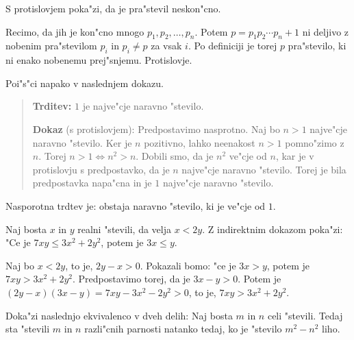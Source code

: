 \documentclass[11pt,paper=b5,footinclude,headinclude]{scrbook} %
\newtheorem{ex}{Vaja\hypertarget{sol:\theex}}[chapter]
\begin{document}
\begin{ex}
\end{ex} \begin{ex} S protislovjem poka"zi, da je pra"stevil neskon"cno.

\begin{sol}Recimo, da jih je kon"cno mnogo $p_1,p_2,\ldots, p_n$. Potem  $p=p_1p_2\cdots p_n+1$ ni deljivo z nobenim pra"stevilom $p_i$ in $p_i\neq p$ za vsak $i$. Po definiciji je torej $p$ pra"stevilo, ki ni enako nobenemu prej"snjemu. Protislovje.
\end{sol}

\end{ex} \begin{ex} Poi"s"ci napako v naslednjem dokazu. 

\begin{quote}
\textbf{Trditev:} $1$ je najve"cje naravno "stevilo. 

\textbf{Dokaz} (s protislovjem):
Predpostavimo nasprotno. Naj bo $n>1$ najve"cje naravno "stevilo. Ker je $n$ pozitivno, lahko neenakost $n>1$ pomno"zimo z $n$. Torej $n>1\Leftrightarrow n^2>n$. Dobili smo, da je $n^2$ ve"cje od $n$, kar je v protislovju s predpostavko, da je $n$ najve"cje naravno "stevilo. Torej je bila predpostavka napa"cna in je $1$ najve"cje naravno "stevilo.
\end{quote}


\begin{sol}
 Nasporotna trdtev je: obstaja naravno "stevilo, ki je ve"cje od $1$.
\end{sol}


\end{ex} \begin{ex} Naj bosta $x$ in $y$ realni "stevili, da velja $x<2y$. Z indirektnim dokazom poka"zi: "Ce je $7xy\leq 3x^2 + 2y^2$, potem je $3x\leq y$.

\begin{sol}Naj bo $x<2y$, to je, $2y-x>0$. Pokazali bomo: "ce je $3x> y$, potem je $7xy > 3x^2 + 2y^2$. Predpostavimo torej, da je $3x-y>0$. Potem je $(2y-x)(3x-y)= 7xy - 3x^2 - 2y^2>0$, to je, $7xy > 3x^2 + 2y^2$.
\end{sol}

\end{ex} \begin{ex} Doka"zi naslednjo ekvivalenco v dveh delih: Naj bosta $m$ in $n$ celi "stevili. Tedaj sta "stevili $m$ in $n$ razli"cnih parnosti natanko tedaj, ko je "stevilo $m^2- n^2$ liho.

\begin{sol}


\end{sol}
\end{ex}
\end{document}
